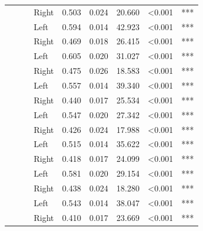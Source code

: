 \begin{longtable}[t]{>{\raggedright\arraybackslash}t{4cm}>{\raggedright\arraybackslash}t{4cm}>{\raggedright\arraybackslash}t{2.5cm}lrrrll}
\nopagebreak
 &  &  & Right & 0.503 & 0.024 & 20.660 & <0.001 & ***\\
\nopagebreak
 &  &  & Left & 0.594 & 0.014 & 42.923 & <0.001 & ***\\
\nopagebreak
 &  &  & Right & 0.469 & 0.018 & 26.415 & <0.001 & ***\\
\nopagebreak
 &  &  & Left & 0.605 & 0.020 & 31.027 & <0.001 & ***\\
\nopagebreak
 &  &  & Right & 0.475 & 0.026 & 18.583 & <0.001 & ***\\
\nopagebreak
 &  &  & Left & 0.557 & 0.014 & 39.340 & <0.001 & ***\\
\nopagebreak
 &  &  & Right & 0.440 & 0.017 & 25.534 & <0.001 & ***\\
\nopagebreak
 &  &  & Left & 0.547 & 0.020 & 27.342 & <0.001 & ***\\
\nopagebreak
 &  &  & Right & 0.426 & 0.024 & 17.988 & <0.001 & ***\\
\nopagebreak
 &  &  & Left & 0.515 & 0.014 & 35.622 & <0.001 & ***\\
\nopagebreak
{} &  &  & Right & 0.418 & 0.017 & 24.099 & <0.001 & ***\\
\pagebreak[0]
 &  &  & Left & 0.581 & 0.020 & 29.154 & <0.001 & ***\\
\nopagebreak
 &  &  & Right & 0.438 & 0.024 & 18.280 & <0.001 & ***\\
\nopagebreak
 &  &  & Left & 0.543 & 0.014 & 38.047 & <0.001 & ***\\
\nopagebreak
 &  &  & Right & 0.410 & 0.017 & 23.669 & <0.001 & ***\\

\end{longtable}
